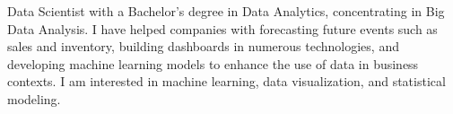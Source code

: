 

\begin{cvparagraph}

Data Scientist with a Bachelor's degree in Data Analytics, concentrating in Big Data Analysis. I have helped companies with forecasting future events such as sales and inventory, building dashboards in numerous technologies, and developing machine learning models to enhance the use of data in business contexts. I am interested in machine learning, data visualization, and statistical modeling.
\end{cvparagraph}

